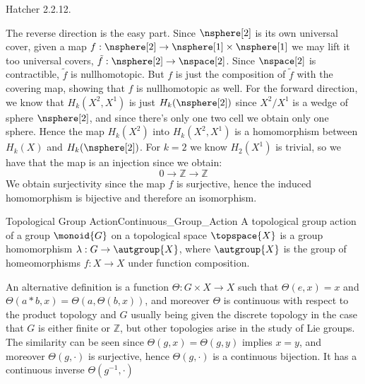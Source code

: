     \begin{problem}
        Hatcher 2.2.12.
    \end{problem}
    \begin{solution}
        The reverse direction is the easy part. Since $\nsphere[2]$ is its own
        universal cover, given a map $f:\nsphere[2]\rightarrow\nsphere[1]\times\nsphere[1]$
        we may lift it too universal covers, $\tilde{f}:\nsphere[2]\rightarrow\nspace[2]$.
        Since $\nspace[2]$ is contractible, $\tilde{f}$ is nullhomotopic. But
        $f$ is just the composition of $\tilde{f}$ with the covering map,
        showing that $f$ is nullhomotopic as well. For the forward direction,
        we know that $H_{k}(X^{2},X^{1})$ is just $H_{k}(\nsphere[2])$ since
        $X^{2}/X^{1}$ is a wedge of sphere $\nsphere[2]$, and since there's only
        one two cell we obtain only one sphere. Hence the map
        $H_{k}(X^{2})$ into $H_{k}(X^{2},X^{1})$ is a homomorphism between
        $H_{k}(X)$ and $H_{k}(\nsphere[2])$. For $k=2$ we know $H_{2}(X^{1})$ is
        trivial, so we have that the map is an injection since we obtain:
        \begin{equation}
            0\rightarrow\mathbb{Z}\rightarrow\mathbb{Z}
        \end{equation}
        We obtain surjectivity since the map $f$ is surjective, hence the
        induced homomorphism is bijective and therefore an isomorphism.
    \end{solution}
    \begin{fdefinition}{Topological Group Action}{Continuous_Group_Action}
        A topological group action of a group $\monoid{G}$ on a topological space
        $\topspace{X}$ is a group homomorphism $\lambda:G\rightarrow\autgroup{X}$,
        where $\autgroup{X}$ is the group of homeomorphisms $f:X\rightarrow{X}$
        under function composition.
    \end{fdefinition}
    An alternative definition is a function $\Theta:G\times{X}\rightarrow{X}$
    such that $\Theta(e,x)=x$ and $\Theta(a*b,x)=\Theta(a,\Theta(b,x))$, and
    moreover $\Theta$ is continuous with respect to the product topology and
    $G$ usually being given the discrete topology in the case that $G$ is either
    finite or $\mathbb{Z}$, but other topologies arise in the study of Lie
    groups. The similarity can be seen since $\Theta(g,x)=\Theta(g,y)$ implies
    $x=y$, and moreover $\Theta(g,\cdot)$ is surjective, hence $\Theta(g,\cdot)$
    is a continuous bijection. It has a continuous inverse $\Theta(g^{\minus{1}},\cdot)$
